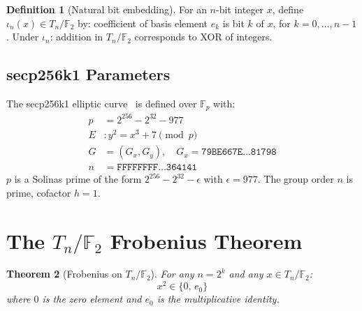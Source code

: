 \documentclass[runningheads]{llncs}
\theoremstyle{plain}
\newtheorem{theorem}{Theorem}
\theoremstyle{definition}
\newtheorem{definition}[theorem]{Definition}
\newcommand{\GFtwo}{\mathbb{F}_2}
\newcommand{\Fp}{\mathbb{F}_p}
\begin{document}
\begin{definition}[Natural bit embedding]
\label{def:embed}
For an $n$-bit integer $x$, define $\iota_n(x) \in T_n/\GFtwo$ by:
coefficient of basis element $e_k$ is bit $k$ of $x$, for $k = 0,\ldots,n-1$.
Under $\iota_n$: addition in $T_n/\GFtwo$ corresponds to XOR of integers.
\end{definition}

\subsection{secp256k1 Parameters}

The secp256k1 elliptic curve~\cite{SEC2} is defined over $\Fp$ with:
\begin{align*}
p &= 2^{256} - 2^{32} - 977 \\
E &: y^2 = x^3 + 7 \pmod{p} \\
G &= (G_x, G_y), \quad G_x = \mathtt{79BE667E\ldots 81798} \\
n &= \mathtt{FFFFFFFF\ldots 364141}
\end{align*}
$p$ is a Solinas prime of the form $2^{256} - 2^{32} - \epsilon$ with
$\epsilon = 977$. The group order $n$ is prime, cofactor $h = 1$.


\section{The \texorpdfstring{$T_n/\GFtwo$}{Tn/GF2} Frobenius Theorem}
\label{sec:theorem}

\begin{theorem}[Frobenius on $T_n/\GFtwo$]
\label{thm:frobenius}
For any $n = 2^k$ and any $x \in T_n/\GFtwo$:
\[
x^2 \in \{0,\, e_0\}
\]
where $0$ is the zero element and $e_0$ is the multiplicative identity.
\end{theorem}
\end{document}
